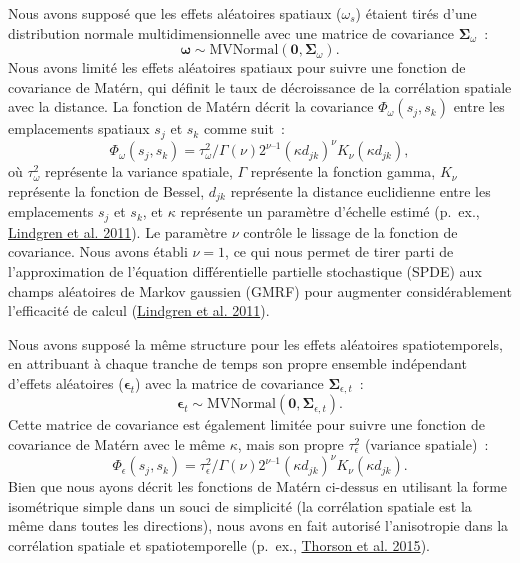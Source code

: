 \documentclass[french,11pt]{book}
\begin{document}
Nous avons supposé que les effets aléatoires spatiaux (\(\omega_s\)) étaient tirés d'une distribution normale multidimensionnelle avec une matrice de covariance \(\bm{\Sigma}_\omega\)~:
\begin{equation}
\bm{\omega} \sim \mathrm{MVNormal} \left( \bm{0}, \bm{\Sigma}_\omega \right).
\end{equation}
Nous avons limité les effets aléatoires spatiaux pour suivre une fonction de covariance de \mbox{Mat\'ern}, qui définit le taux de décroissance de la corrélation spatiale avec la distance. La fonction de \mbox{Mat\'ern} décrit la covariance \(\Phi_\omega \left( s_j, s_k \right)\) entre les emplacements spatiaux \(s_j\) et \(s_k\) comme suit~:
\begin{equation}
\Phi_\omega\left( s_j,s_k \right) = \tau_\omega^2/\Gamma(\nu)2^{\nu – 1}
    (\kappa d_{jk})^\nu K_\nu \left( \kappa d_{jk} \right),
\end{equation}
où \(\tau_\omega^2\) représente la variance spatiale, \(\Gamma\) représente la fonction gamma, \(K_\nu\) représente la fonction de Bessel, \(d_{jk}\) représente la distance euclidienne entre les emplacements \(s_j\) et \(s_k\), et \(\kappa\) représente un paramètre d'échelle estimé (p.~ex., \protect\hyperlink{ref-lindgren2011}{Lindgren et al. 2011}). Le paramètre \(\nu\) contrôle le lissage de la fonction de covariance. Nous avons établi \(\nu = 1\), ce qui nous permet de tirer parti de l'approximation de l'équation différentielle partielle stochastique (SPDE) aux champs aléatoires de Markov gaussien (GMRF) pour augmenter considérablement l'efficacité de calcul (\protect\hyperlink{ref-lindgren2011}{Lindgren et al. 2011}).

Nous avons supposé la même structure pour les effets aléatoires spatiotemporels, en attribuant à chaque tranche de temps son propre ensemble indépendant d'effets aléatoires (\(\bm{\epsilon}_t\)) avec la matrice de covariance \(\bm{\Sigma}_{\epsilon,t}\)~:
\begin{equation}
\bm{\epsilon}_t \sim \mathrm{MVNormal} \left( \bm{0}, \bm{\Sigma}_{\epsilon,t} \right).
\end{equation}
Cette matrice de covariance est également limitée pour suivre une fonction de covariance de \mbox{Mat\'ern} avec le même \(\kappa\), mais son propre \(\tau_\epsilon^2\) (variance spatiale)~:
\begin{equation}
\Phi_\epsilon\left( s_j,s_k \right) = \tau_\epsilon^2/\Gamma(\nu)2^{\nu – 1}
    (\kappa d_{jk})^\nu K_\nu \left( \kappa d_{jk} \right).
\end{equation}
Bien que nous ayons décrit les fonctions de \mbox{Mat\'ern} ci-dessus en utilisant la forme isométrique simple dans un souci de simplicité (la corrélation spatiale est la même dans toutes les directions), nous avons en fait autorisé l'anisotropie dans la corrélation spatiale et spatiotemporelle (p.~ex., \protect\hyperlink{ref-thorson2015}{Thorson et al. 2015}).
\end{document}
